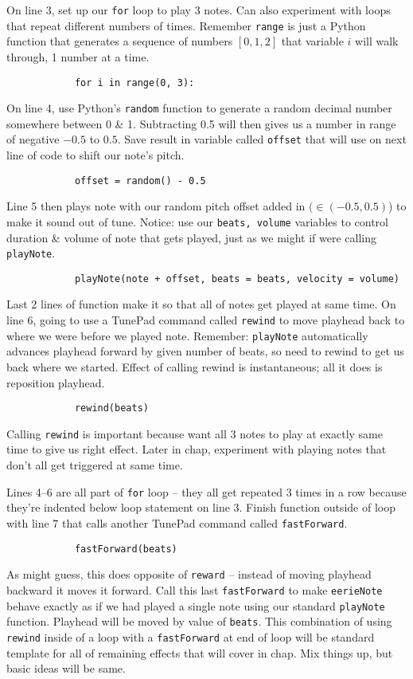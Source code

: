 \documentclass{article}
\begin{document}
\begin{itemize}
\begin{itemize}
		On line 3, set up our {\tt for} loop to play 3 notes. Can also experiment with loops that repeat different numbers of times. Remember {\tt range} is just a Python function that generates a sequence of numbers $[0,1,2]$ that variable $i$ will walk through, 1 number at a time.
		\begin{verbatim}
			for i in range(0, 3):
		\end{verbatim}
		On line 4, use Python's {\tt random} function to generate a random decimal number somewhere between 0 \& 1. Subtracting 0.5 will then gives us a number in range of negative $-0.5$ to $0.5$. Save result in variable called {\tt offset} that will use on next line of code to shift our note's pitch.
		\begin{verbatim}
			offset = random() - 0.5
		\end{verbatim}
		Line 5 then plays note with our random pitch offset added in $(\in(-0.5,0.5)$) to make it sound out of tune. Notice: use our {\tt beats, volume} variables to control duration \& volume of note that gets played, just as we might if were calling {\tt playNote}.
		\begin{verbatim}
			playNote(note + offset, beats = beats, velocity = volume)
		\end{verbatim}
		Last 2 lines of function make it so that all of notes get played at same time. On line 6, going to use a TunePad command called {\tt rewind} to move playhead back to where we were before we played note. Remember: {\tt playNote} automatically advances playhead forward by given number of beats, so need to rewind to get us back where we started. Effect of calling rewind is instantaneous; all it does is reposition playhead.
		\begin{verbatim}
			rewind(beats)
		\end{verbatim}
		Calling {\tt rewind} is important because want all 3 notes to play at exactly same time to give us right effect. Later in chap, experiment with playing notes that don't all get triggered at same time.
		
		Lines 4--6 are all part of {\tt for} loop -- they all get repeated 3 times in a row because they're indented below loop statement on line 3. Finish function outside of loop with line 7 that calls another TunePad command called {\tt fastForward}.
		\begin{verbatim}
			fastForward(beats)
		\end{verbatim}
		As might guess, this does opposite of {\tt reward} -- instead of moving playhead backward it moves it forward. Call this last {\tt fastForward} to make {\tt eerieNote} behave exactly as if we had played a single note using our standard {\tt playNote} function. Playhead will be moved by value of {\tt beats}. This combination of using {\tt rewind} inside of a loop with a {\tt fastForward} at end of loop will be standard template for all of remaining effects that will cover in chap. Mix things up, but basic ideas will be same.
		

\end{itemize}
\end{itemize}
\end{document}
